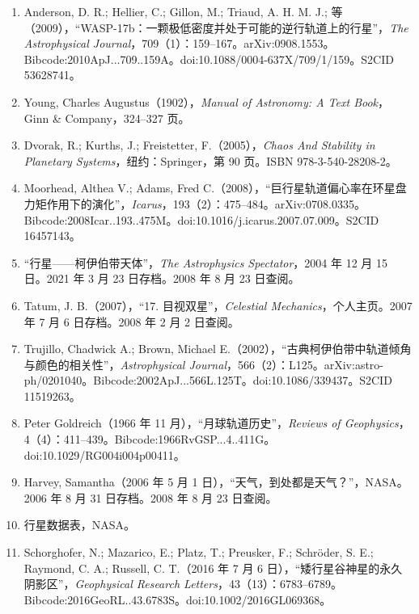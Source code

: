 \begin{enumerate}
\item Anderson, D. R.; Hellier, C.; Gillon, M.; Triaud, A. H. M. J.; 等（2009），“WASP-17b：一颗极低密度并处于可能的逆行轨道上的行星”，\textit{The Astrophysical Journal}，709（1）：159–167。arXiv:0908.1553。Bibcode:2010ApJ...709..159A。doi:10.1088/0004-637X/709/1/159。S2CID 53628741。

\item Young, Charles Augustus（1902），\textit{Manual of Astronomy: A Text Book}，Ginn & Company，324–327 页。

\item Dvorak, R.; Kurths, J.; Freistetter, F.（2005），\textit{Chaos And Stability in Planetary Systems}，纽约：Springer，第 90 页。ISBN 978-3-540-28208-2。

\item Moorhead, Althea V.; Adams, Fred C.（2008），“巨行星轨道偏心率在环星盘力矩作用下的演化”，\textit{Icarus}，193（2）：475–484。arXiv:0708.0335。Bibcode:2008Icar..193..475M。doi:10.1016/j.icarus.2007.07.009。S2CID 16457143。

\item “行星——柯伊伯带天体”，\textit{The Astrophysics Spectator}，2004 年 12 月 15 日。2021 年 3 月 23 日存档。2008 年 8 月 23 日查阅。

\item Tatum, J. B.（2007），“17. 目视双星”，\textit{Celestial Mechanics}，个人主页。2007 年 7 月 6 日存档。2008 年 2 月 2 日查阅。

\item Trujillo, Chadwick A.; Brown, Michael E.（2002），“古典柯伊伯带中轨道倾角与颜色的相关性”，\textit{Astrophysical Journal}，566（2）：L125。arXiv:astro-ph/0201040。Bibcode:2002ApJ...566L.125T。doi:10.1086/339437。S2CID 11519263。

\item Peter Goldreich（1966 年 11 月），“月球轨道历史”，\textit{Reviews of Geophysics}，4（4）：411–439。Bibcode:1966RvGSP...4..411G。doi:10.1029/RG004i004p00411。

\item Harvey, Samantha（2006 年 5 月 1 日），“天气，到处都是天气？”，NASA。2006 年 8 月 31 日存档。2008 年 8 月 23 日查阅。

\item 行星数据表，NASA。

\item Schorghofer, N.; Mazarico, E.; Platz, T.; Preusker, F.; Schröder, S. E.; Raymond, C. A.; Russell, C. T.（2016 年 7 月 6 日），“矮行星谷神星的永久阴影区”，\textit{Geophysical Research Letters}，43（13）：6783–6789。Bibcode:2016GeoRL..43.6783S。doi:10.1002/2016GL069368。


\end{enumerate}
